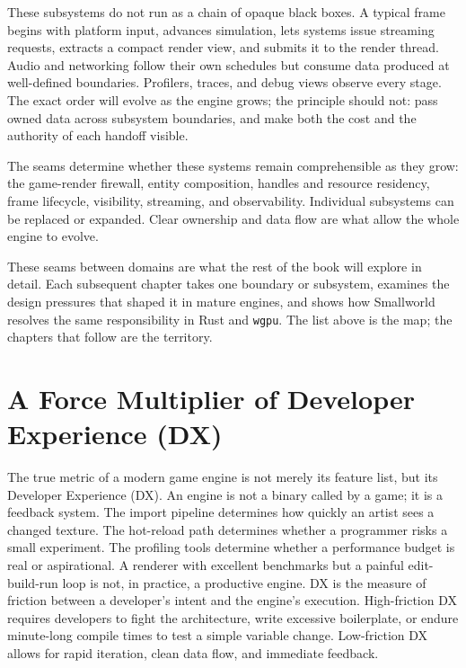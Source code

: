 \documentclass[
  11pt,
  letterpaper,
  DIV=11,
  numbers=noendperiod,
  twoside,
  open=right]{scrreprt}
\begin{document}
These subsystems do not run as a chain of opaque black boxes. A typical
frame begins with platform input, advances simulation, lets systems
issue streaming requests, extracts a compact render view, and submits it
to the render thread. Audio and networking follow their own schedules
but consume data produced at well-defined boundaries. Profilers, traces,
and debug views observe every stage. The exact order will evolve as the
engine grows; the principle should not: pass owned data across subsystem
boundaries, and make both the cost and the authority of each handoff
visible.

The seams determine whether these systems remain comprehensible as they
grow: the game-render firewall, entity composition, handles and resource
residency, frame lifecycle, visibility, streaming, and observability.
Individual subsystems can be replaced or expanded. Clear ownership and
data flow are what allow the whole engine to evolve.

These seams between domains are what the rest of the book will explore
in detail. Each subsequent chapter takes one boundary or subsystem,
examines the design pressures that shaped it in mature engines, and
shows how Smallworld resolves the same responsibility in Rust and
\texttt{wgpu}. The list above is the map; the chapters that follow are
the territory.

\section{A Force Multiplier of Developer Experience
(DX)}\label{a-force-multiplier-of-developer-experience-dx}

The true metric of a modern game engine is not merely its feature list,
but its Developer Experience (DX). An engine is not a binary called by a
game; it is a feedback system. The import pipeline determines how
quickly an artist sees a changed texture. The hot-reload path determines
whether a programmer risks a small experiment. The profiling tools
determine whether a performance budget is real or aspirational. A
renderer with excellent benchmarks but a painful edit-build-run loop is
not, in practice, a productive engine. DX is the measure of friction
between a developer's intent and the engine's execution. High-friction
DX requires developers to fight the architecture, write excessive
boilerplate, or endure minute-long compile times to test a simple
variable change. Low-friction DX allows for rapid iteration, clean data
flow, and immediate feedback.
\end{document}
